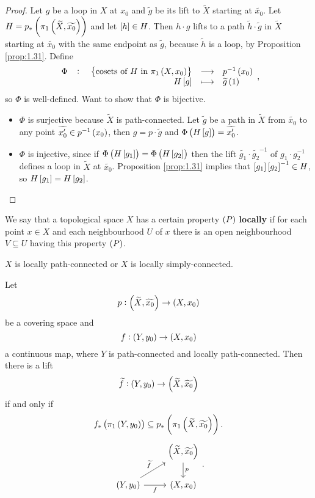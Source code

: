 \begin{proof}
Let $ g $ be a loop in $ X $ at $ x_0 $ and $ \widetilde{g} $ be its lift to $ \widetilde{X} $ starting at $ \widetilde{x_0} $. Let $ H = p_*\br{\pi_1\br{\widetilde{X}, \widetilde{x_0}}} $ and let $ \sbr{h} \in H $. Then $ h \cdot g $ lifts to a path $ \widetilde{h} \cdot \widetilde{g} $ in $ \widetilde{X} $ starting at $ \widetilde{x_0} $ with the same endpoint as $ \widetilde{g} $, because $ \widetilde{h} $ is a loop, by Proposition \ref{prop:1.31}. Define
$$ \function[\Phi]{\cbr{\text{cosets of} \ H \ \text{in} \ \pi_1\br{X, x_0}}}{p^{-1}\br{x_0}}{H\sbr{g}}{\widetilde{g}\br{1}}, $$
so $ \Phi $ is well-defined. Want to show that $ \Phi $ is bijective.
\begin{itemize}
\item $ \Phi $ is surjective because $ \widetilde{X} $ is path-connected. Let $ \widetilde{g} $ be a path in $ \widetilde{X} $ from $ \widetilde{x_0} $ to any point $ \widetilde{x_0'} \in p^{-1}\br{x_0} $, then $ g = p \cdot \widetilde{g} $ and $ \Phi\br{H\sbr{g}} = \widetilde{x_0'} $.
\item $ \Phi $ is injective, since if $ \Phi\br{H\sbr{g_1}} = \Phi\br{H\sbr{g_2}} $ then the lift $ \widetilde{g_1} \cdot \widetilde{g_2}^{-1} $ of $ g_1 \cdot g_2^{-1} $ defines a loop in $ \widetilde{X} $ at $ \widetilde{x_0} $. Proposition \ref{prop:1.31} implies that $ \sbr{g_1}\sbr{g_2}^{-1} \in H $, so $ H\sbr{g_1} = H\sbr{g_2} $.
\end{itemize}
\end{proof}

We say that a topological space $ X $ has a certain property $ \br{P} $ \textbf{locally} if for each point $ x \in X $ and each neighbourhood $ U $ of $ x $ there is an open neighbourhood $ V \subseteq U $ having this property $ \br{P} $.

\begin{example*}
$ X $ is locally path-connected or $ X $ is locally simply-connected.
\end{example*}

\begin{proposition}
\label{prop:1.33}
Let
$$ p : \br{\widetilde{X}, \widetilde{x_0}} \to \br{X, x_0} $$
be a covering space and
$$ f : \br{Y, y_0} \to \br{X, x_0} $$
a continuous map, where $ Y $ is path-connected and locally path-connected. Then there is a lift
$$ \widetilde{f} : \br{Y, y_0} \to \br{\widetilde{X}, \widetilde{x_0}} $$
if and only if
$$ f_*\br{\pi_1\br{Y, y_0}} \subseteq p_*\br{\pi_1\br{\widetilde{X}, \widetilde{x_0}}}. $$
$$
\begin{tikzcd}
& \br{\widetilde{X}, \widetilde{x_0}} \arrow{d}{p} \\
\br{Y, y_0} \arrow{ur}{\widetilde{f}} \arrow[swap]{r}{f} & \br{X, x_0}
\end{tikzcd}.
$$
\end{proposition}

